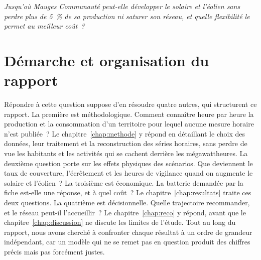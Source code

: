 \begin{center}
\begin{minipage}{0.9\textwidth}
\itshape Jusqu'où Mauges Communauté peut-elle développer le solaire et l'éolien sans perdre plus de 5~\% de sa production ni saturer son réseau, et quelle flexibilité le permet au meilleur coût~?
\end{minipage}
\end{center}

\section*{Démarche et organisation du rapport}

Répondre à cette question suppose d'en résoudre quatre autres, qui structurent ce rapport. La première est méthodologique. Comment connaître heure par heure la production et la consommation d'un territoire pour lequel aucune mesure horaire n'est publiée~? Le chapitre~\ref{chap:methode} y répond en détaillant le choix des données, leur traitement et la reconstruction des séries horaires, sans perdre de vue les habitants et les activités qui se cachent derrière les mégawattheures. La deuxième question porte sur les effets physiques des scénarios. Que deviennent le taux de couverture, l'écrêtement et les heures de vigilance quand on augmente le solaire et l'éolien~? La troisième est économique. La batterie demandée par la fiche est-elle une réponse, et à quel coût~? Le chapitre~\ref{chap:resultats} traite ces deux questions. La quatrième est décisionnelle. Quelle trajectoire recommander, et le réseau peut-il l'accueillir~? Le chapitre~\ref{chap:reco} y répond, avant que le chapitre~\ref{chap:discussion} ne discute les limites de l'étude. Tout au long du rapport, nous avons cherché à confronter chaque résultat à un ordre de grandeur indépendant, car un modèle qui ne se remet pas en question produit des chiffres précis mais pas forcément justes.

